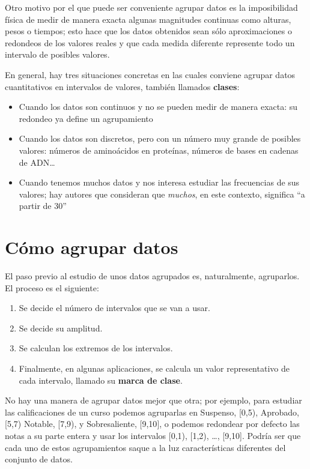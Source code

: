 \documentclass[
]{book}
\providecommand{\tightlist}{%
  \setlength{\itemsep}{0pt}\setlength{\parskip}{0pt}}
\theoremstyle{definition}
\theoremstyle{definition}
\theoremstyle{definition}
\theoremstyle{remark}
\begin{document}
Otro motivo por el que puede ser conveniente agrupar datos es la imposibilidad física de medir de manera exacta algunas magnitudes continuas como alturas, pesos o tiempos; esto hace que los datos obtenidos sean sólo aproximaciones o redondeos de los valores reales y que cada medida diferente represente todo un intervalo de posibles valores.

En general, hay tres situaciones concretas en las cuales conviene agrupar datos cuantitativos en intervalos de valores, también llamados \textbf{clases}:

\begin{itemize}
\item
  Cuando los datos son continuos y no se pueden medir de manera exacta: su redondeo ya define un agrupamiento
\item
  Cuando los datos son discretos, pero con un número muy grande de posibles valores: números de aminoácidos en proteínas, números de bases en cadenas de ADN\ldots{}
\item
  Cuando tenemos muchos datos y nos interesa estudiar las frecuencias de sus valores; hay autores que consideran que \emph{muchos}, en este contexto, significa ``a partir de 30''
\end{itemize}

\hypertarget{cuxf3mo-agrupar-datos}{%
\section{Cómo agrupar datos}\label{cuxf3mo-agrupar-datos}}

El paso previo al estudio de unos datos agrupados es, naturalmente, agruparlos. El proceso es el siguiente:

\begin{enumerate}
\def\labelenumi{\arabic{enumi}.}
\tightlist
\item
  Se decide el número de intervalos que se van a usar.
\item
  Se decide su amplitud.
\item
  Se calculan los extremos de los intervalos.
\item
  Finalmente, en algunas aplicaciones, se calcula un valor representativo de cada intervalo, llamado su \textbf{marca de clase}.
\end{enumerate}

No hay una manera de agrupar datos mejor que otra; por ejemplo, para estudiar las calificaciones de un curso podemos agruparlas en Suspenso, {[}0,5), Aprobado, {[}5,7) Notable, {[}7,9), y Sobresaliente, {[}9,10{]}, o podemos redondear por defecto las notas a su parte entera y usar los intervalos {[}0,1), {[}1,2), \ldots, {[}9,10{]}. Podría ser que cada uno de estos agrupamientos saque a la luz características diferentes del conjunto de datos.
\end{document}
